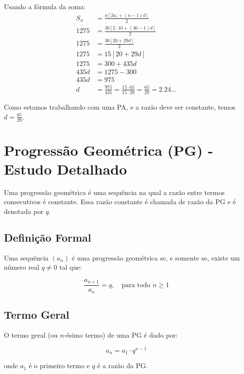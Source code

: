 \documentclass[12pt,a4paper]{article}
\begin{document}
\begin{tcolorbox}[colback=green!5!white,colframe=green!75!black,title=Resolução]
Usando a fórmula da soma:
\begin{align}
S_n &= \frac{n[2a_1 + (n-1)d]}{2}\\
1275 &= \frac{30[2 \cdot 10 + (30-1)d]}{2}\\
1275 &= \frac{30[20 + 29d]}{2}\\
1275 &= 15[20 + 29d]\\
1275 &= 300 + 435d\\
435d &= 1275 - 300\\
435d &= 975\\
d &= \frac{975}{435} = \frac{15 \cdot 65}{15 \cdot 29} = \frac{65}{29} = 2.24...
\end{align}

Como estamos trabalhando com uma PA, e a razão deve ser constante, temos $d = \frac{65}{29}$.
\end{tcolorbox}

\section{Progressão Geométrica (PG) - Estudo Detalhado}

Uma progressão geométrica é uma sequência na qual a razão entre termos consecutivos é constante. Essa razão constante é chamada de razão da PG e é denotada por $q$.

\subsection{Definição Formal}

Uma sequência $(a_n)$ é uma progressão geométrica se, e somente se, existe um número real $q \neq 0$ tal que:

\begin{equation}
\frac{a_{n+1}}{a_n} = q, \quad \text{para todo } n \geq 1
\end{equation}

\subsection{Termo Geral}

O termo geral (ou $n$-ésimo termo) de uma PG é dado por:

\begin{equation}
a_n = a_1 \cdot q^{n-1}
\end{equation}

onde $a_1$ é o primeiro termo e $q$ é a razão da PG.
\end{document}
